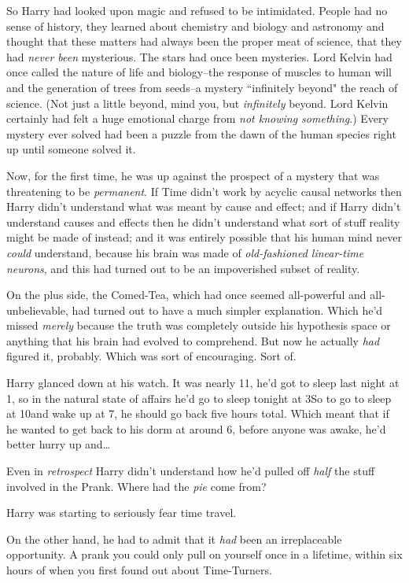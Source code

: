 So Harry had looked upon magic and refused to be intimidated. People had no sense of history, they learned about chemistry and biology and astronomy and thought that these matters had always been the proper meat of science, that they had \emph{never been} mysterious. The stars had once been mysteries. Lord Kelvin had once called the nature of life and biology\---the response of muscles to human will and the generation of trees from seeds\---a mystery ``infinitely beyond" the reach of science. (Not just a little beyond, mind you, but \emph{infinitely} beyond. Lord Kelvin certainly had felt a huge emotional charge from \emph{not knowing something}.) Every mystery ever solved had been a puzzle from the dawn of the human species right up until someone solved it.

Now, for the first time, he was up against the prospect of a mystery that was threatening to be \emph{permanent}. If Time didn't work by acyclic causal networks then Harry didn't understand what was meant by cause and effect; and if Harry didn't understand causes and effects then he didn't understand what sort of stuff reality might be made of instead; and it was entirely possible that his human mind never \emph{could} understand, because his brain was made of \emph{old-fashioned linear-time neurons}, and this had turned out to be an impoverished subset of reality.

On the plus side, the Comed-Tea, which had once seemed all-powerful and all-unbelievable, had turned out to have a much simpler explanation. Which he'd missed \emph{merely} because the truth was completely outside his hypothesis space or anything that his brain had evolved to comprehend. But now he actually \emph{had} figured it, probably. Which was sort of encouraging. Sort of.

Harry glanced down at his watch. It was nearly 11\am, he'd got to sleep last night at 1\am, so in the natural state of affairs he'd go to sleep tonight at 3\am So to go to sleep at 10\pm and wake up at 7\am, he should go back five hours total. Which meant that if he wanted to get back to his dorm at around 6\am, before anyone was awake, he'd better hurry up and{\ldots}

Even in \emph{retrospect} Harry didn't understand how he'd pulled off \emph{half} the stuff involved in the Prank. Where had the \emph{pie} come from?

Harry was starting to seriously fear time travel.

On the other hand, he had to admit that it \emph{had} been an irreplaceable opportunity. A prank you could only pull on yourself once in a lifetime, within six hours of when you first found out about Time-Turners.

